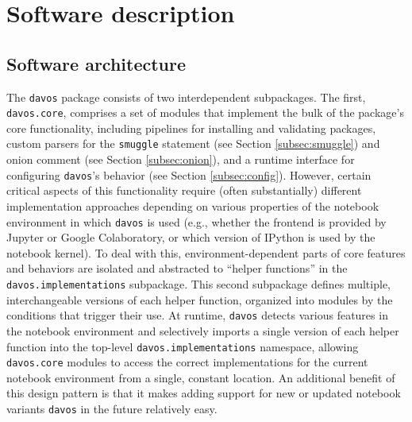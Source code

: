 \documentclass[preprint,12pt, a4paper]{elsarticle}
\newcommand{\comment}[1]{}
\begin{document}
\section{Software description}


\subsection{Software architecture}
The \texttt{davos} package consists of two interdependent subpackages. The first, \texttt{davos.core}, comprises a set of modules that implement\comment{provide?} the bulk of the package's core functionality, including pipelines for installing and validating packages, custom parsers for the \texttt{smuggle} statement (see Section \ref{subsec:smuggle}) and onion comment (see Section \ref{subsec:onion}), and a runtime interface for configuring \texttt{davos}'s behavior (see Section \ref{subsec:config}). However, certain critical\comment{other important} aspects of this functionality require (often substantially) different implementation approaches depending on various properties of the notebook environment in which \texttt{davos} is used (e.g., whether the frontend is provided by Jupyter or Google Colaboratory, or which version of IPython \cite{PereGran07} is used by the notebook kernel). To deal with this, environment-dependent parts of core features and behaviors are isolated and abstracted to ``helper functions'' in the \texttt{davos.implementations} subpackage. This second subpackage defines multiple, interchangeable versions of each helper function, organized into\comment{per-environment} modules by the conditions that trigger their use. At runtime, \texttt{davos} detects various features in the notebook environment and selectively imports a single version of each helper function into the top-level \texttt{davos.implementations} namespace, allowing \texttt{davos.core} modules to access the correct implementations for the current notebook environment from a single, constant location. An additional benefit of this design pattern is that it makes adding support for new or updated notebook variants \texttt{davos} in the future relatively easy.

\comment{
- js_functions.py?
- how parser is registered and deregistered?
- stub files?
- test suite?
- packaged with new PEP \_\_\_ standard (pyproject.toml + setup.cfg; no setup.py)?
}
\end{document}
